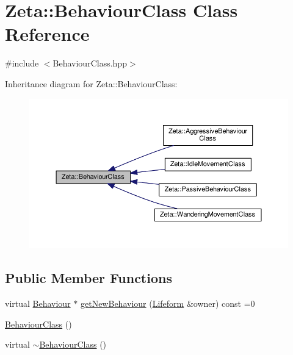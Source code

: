 \hypertarget{classZeta_1_1BehaviourClass}{\section{Zeta\+:\+:Behaviour\+Class Class Reference}
\label{classZeta_1_1BehaviourClass}
}


{\ttfamily \#include $<$Behaviour\+Class.\+hpp$>$}



Inheritance diagram for Zeta\+:\+:Behaviour\+Class\+:\nopagebreak
\begin{figure}[H]
\begin{center}
\leavevmode
\includegraphics[width=350pt]{classZeta_1_1BehaviourClass__inherit__graph}
\end{center}
\end{figure}
\subsection*{Public Member Functions}
\begin{DoxyCompactItemize}
\item 
virtual \hyperlink{classZeta_1_1Behaviour}{Behaviour} $\ast$ \hyperlink{classZeta_1_1BehaviourClass_aeaf604f49cc95501422dfd177de64287}{get\+New\+Behaviour} (\hyperlink{classZeta_1_1Lifeform}{Lifeform} \&owner) const =0
\item 
\hyperlink{classZeta_1_1BehaviourClass_a260d021f1fcd5494303e7fcbf78b3428}{Behaviour\+Class} ()
\item 
virtual \hyperlink{classZeta_1_1BehaviourClass_abcb609496d577d3fa9da748c130813d6}{$\sim$\+Behaviour\+Class} ()
\end{DoxyCompactItemize}


